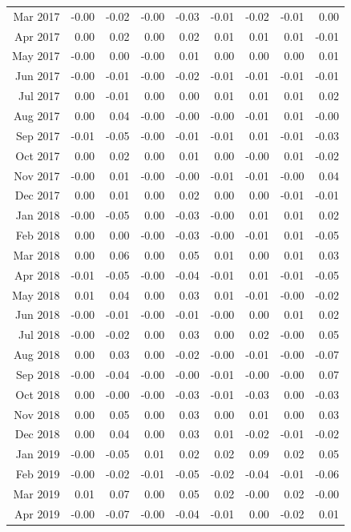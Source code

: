\begin{tabularx}{\textwidth}{rrrrrrrrr}
  Mar 2017 & -0.00 & -0.02 & -0.00 & -0.03 & -0.01 & -0.02 & -0.01 & 0.00 \\ 
  Apr 2017 & 0.00 & 0.02 & 0.00 & 0.02 & 0.01 & 0.01 & 0.01 & -0.01 \\ 
  May 2017 & -0.00 & 0.00 & -0.00 & 0.01 & 0.00 & 0.00 & 0.00 & 0.01 \\ 
  Jun 2017 & -0.00 & -0.01 & -0.00 & -0.02 & -0.01 & -0.01 & -0.01 & -0.01 \\ 
  Jul 2017 & 0.00 & -0.01 & 0.00 & 0.00 & 0.01 & 0.01 & 0.01 & 0.02 \\ 
  Aug 2017 & 0.00 & 0.04 & -0.00 & -0.00 & -0.00 & -0.01 & 0.01 & -0.00 \\ 
  Sep 2017 & -0.01 & -0.05 & -0.00 & -0.01 & -0.01 & 0.01 & -0.01 & -0.03 \\ 
  Oct 2017 & 0.00 & 0.02 & 0.00 & 0.01 & 0.00 & -0.00 & 0.01 & -0.02 \\ 
  Nov 2017 & -0.00 & 0.01 & -0.00 & -0.00 & -0.01 & -0.01 & -0.00 & 0.04 \\ 
  Dec 2017 & 0.00 & 0.01 & 0.00 & 0.02 & 0.00 & 0.00 & -0.01 & -0.01 \\ 
  Jan 2018 & -0.00 & -0.05 & 0.00 & -0.03 & -0.00 & 0.01 & 0.01 & 0.02 \\ 
  Feb 2018 & 0.00 & 0.00 & -0.00 & -0.03 & -0.00 & -0.01 & 0.01 & -0.05 \\ 
  Mar 2018 & 0.00 & 0.06 & 0.00 & 0.05 & 0.01 & 0.00 & 0.01 & 0.03 \\ 
  Apr 2018 & -0.01 & -0.05 & -0.00 & -0.04 & -0.01 & 0.01 & -0.01 & -0.05 \\ 
  May 2018 & 0.01 & 0.04 & 0.00 & 0.03 & 0.01 & -0.01 & -0.00 & -0.02 \\ 
  Jun 2018 & -0.00 & -0.01 & -0.00 & -0.01 & -0.00 & 0.00 & 0.01 & 0.02 \\ 
  Jul 2018 & -0.00 & -0.02 & 0.00 & 0.03 & 0.00 & 0.02 & -0.00 & 0.05 \\ 
  Aug 2018 & 0.00 & 0.03 & 0.00 & -0.02 & -0.00 & -0.01 & -0.00 & -0.07 \\ 
  Sep 2018 & -0.00 & -0.04 & -0.00 & -0.00 & -0.01 & -0.00 & -0.00 & 0.07 \\ 
  Oct 2018 & 0.00 & -0.00 & -0.00 & -0.03 & -0.01 & -0.03 & 0.00 & -0.03 \\ 
  Nov 2018 & 0.00 & 0.05 & 0.00 & 0.03 & 0.00 & 0.01 & 0.00 & 0.03 \\ 
  Dec 2018 & 0.00 & 0.04 & 0.00 & 0.03 & 0.01 & -0.02 & -0.01 & -0.02 \\ 
  Jan 2019 & -0.00 & -0.05 & 0.01 & 0.02 & 0.02 & 0.09 & 0.02 & 0.05 \\ 
  Feb 2019 & -0.00 & -0.02 & -0.01 & -0.05 & -0.02 & -0.04 & -0.01 & -0.06 \\ 
  Mar 2019 & 0.01 & 0.07 & 0.00 & 0.05 & 0.02 & -0.00 & 0.02 & -0.00 \\ 
  Apr 2019 & -0.00 & -0.07 & -0.00 & -0.04 & -0.01 & 0.00 & -0.02 & 0.01 \\ 
   \hline
\end{tabularx}
